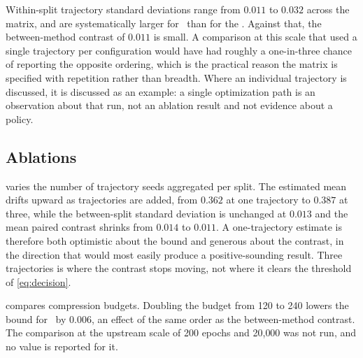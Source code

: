 Within-split trajectory standard deviations range from $0.011$ to $0.032$ across
the matrix, and are systematically larger for \methodrandom\ than for the
\methodcontrol. Against that, the between-method contrast of $0.011$ is small. A
comparison at this scale that used a single trajectory per configuration would
have had roughly a one-in-three chance of reporting the opposite ordering, which
is the practical reason the matrix is specified with repetition rather than
breadth. Where an individual trajectory is discussed, it is discussed as an
example: a single optimization path is an observation about that run, not an
ablation result and not evidence about a policy.

\subsection{Ablations}
\label{sec:ablations}



 varies the number of trajectory seeds aggregated per
split. The estimated mean drifts upward as trajectories are added, from $0.362$
at one trajectory to $0.387$ at three, while the between-split standard deviation
is unchanged at $0.013$ and the mean paired contrast shrinks from $0.014$ to
$0.011$. A one-trajectory estimate is therefore both optimistic about the bound
and generous about the contrast, in the direction that would most easily produce
a positive-sounding result. Three trajectories is where the contrast stops
moving, not where it clears the threshold of \cref{eq:decision}.

 compares compression budgets. Doubling the budget from 120 to
240 lowers the bound for \methodrandom\ by $0.006$, an effect of the same order
as the between-method contrast. The comparison at the upstream scale of 200
epochs and 20{,}000 was not run, and no value is reported for it.
